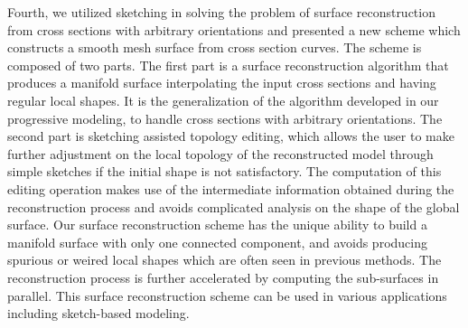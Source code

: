 Fourth, we utilized sketching  in solving the problem of surface
reconstruction from cross sections with arbitrary orientations and
presented a new scheme which constructs a smooth mesh surface from
cross section curves. The scheme is composed of two parts. The first
part is a surface reconstruction algorithm that produces a manifold
surface interpolating the input cross sections and having regular
local shapes. It is the  generalization of the algorithm developed
in our progressive modeling, to handle cross sections with arbitrary
orientations. The second part is sketching assisted topology
editing, which allows the user to make further adjustment on the
local topology of the reconstructed model through simple sketches if
the initial shape is not satisfactory. The computation of this
editing operation makes use of the intermediate information obtained
during the reconstruction process and avoids complicated analysis on
the shape of the global surface. Our surface reconstruction scheme
has the unique ability to build a manifold surface with only one
connected component, and avoids producing spurious or weired local
shapes which are often seen in previous methods. The reconstruction
process is further accelerated by computing the sub-surfaces in
parallel. This surface reconstruction scheme can be used in various
applications including sketch-based modeling.


